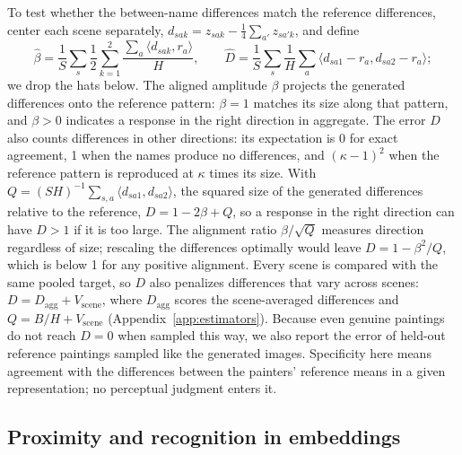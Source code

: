 \documentclass[10pt]{article}
\newcommand{\ip}[2]{\langle #1,#2\rangle}
\begin{document}
To test whether the between-name differences match the reference differences, center each scene
separately, $d_{sak}=z_{sak}-\frac14\sum_{a'}z_{sa'k}$, and define
\begin{equation}
\widehat\beta=\frac1S\sum_s\frac{1}{2}\sum_{k=1}^2\frac{\sum_a\ip{d_{sak}}{r_a}}{H},\qquad
\widehat D=\frac1S\sum_s\frac1H\sum_a\ip{d_{sa1}-r_a}{d_{sa2}-r_a};
\label{eq:beta-d}
\end{equation}
we drop the hats below. The aligned amplitude $\beta$ projects the generated differences onto the
reference pattern: $\beta=1$ matches its size along that pattern, and $\beta>0$ indicates a
response in the right direction in aggregate. The error $D$ also counts differences in other
directions: its expectation is 0 for exact agreement, 1 when the names produce no differences, and
$(\kappa-1)^2$ when the reference pattern is reproduced at $\kappa$ times its size. With
$Q=(SH)^{-1}\sum_{s,a}\ip{d_{sa1}}{d_{sa2}}$, the squared size of the generated differences
relative to the reference, $D=1-2\beta+Q$, so a response in the right direction can have $D>1$ if
it is too large. The alignment ratio $\beta/\sqrt{Q}$ measures direction regardless of size;
rescaling the differences optimally would leave $D=1-\beta^2/Q$, which is below 1 for any positive
alignment. Every scene is compared with the same pooled target, so $D$ also penalizes differences
that vary across scenes: $D=D_{\mathrm{agg}}+V_{\mathrm{scene}}$, where $D_{\mathrm{agg}}$ scores
the scene-averaged differences and $Q=B/H+V_{\mathrm{scene}}$ (Appendix~\ref{app:estimators}).
Because even genuine paintings do not reach $D=0$ when sampled this way, we also report the error
of held-out reference paintings sampled like the generated images. Specificity here means
agreement with the differences between the painters' reference means in a given representation;
no perceptual judgment enters it.

\subsection{Proximity and recognition in embeddings}\label{sec:proximity}
\end{document}
